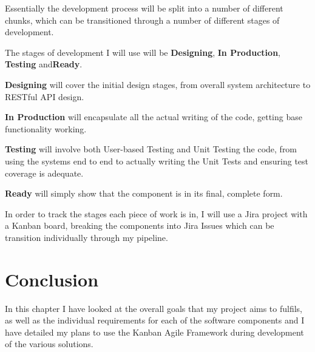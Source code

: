 Essentially the development process will be split into a number of different chunks, which can be transitioned through a number of different stages of development.

The stages of development I will use will be \textbf{Designing}, \textbf{In Production}, \textbf{Testing} and\textbf{Ready}.

\textbf{Designing} will cover the initial design stages, from overall system architecture to RESTful API design.

\textbf{In Production} will encapsulate all the actual writing of the code, getting base functionality working.

\textbf{Testing} will involve both User-based Testing and Unit Testing the code, from using the systems end to end to actually writing the Unit Tests and ensuring test coverage is adequate.

\textbf{Ready} will simply show that the component is in its final, complete form.

In order to track the stages each piece of work is in, I will use a Jira project with a Kanban board, breaking the components into Jira Issues which can be transition individually through my pipeline.

\section{Conclusion}
In this chapter I have looked at the overall goals that my project aims to fulfils, as well as the individual requirements for each of the software components and I have detailed my plans to use the Kanban Agile Framework during development of the various solutions.